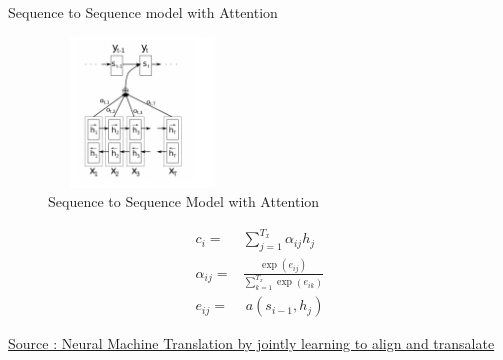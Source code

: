 \documentclass{beamer}
\begin{document}
\begin{frame}{Sequence to Sequence model with Attention}
	\vspace*{-2mm}	

	\begin{figure}
	   \includegraphics[width=5cm, height=4cm]{figs/seq_to_seq_with_attention.png}
	   \caption{Sequence to Sequence Model with Attention}
	\end{figure}

	\vspace*{-10mm}

	\begin{align*}
		c_{i} =& \sum_{j=1}^{T_x}\alpha_{ij}h_{j} \\
		\alpha_{ij} =& \frac{\exp(e_{ij})}{\sum_{k=1}^{T_x} \exp(e_{ik})} \\
		e_{ij} =&\ a(s_{i-1}, h_j)
	\end{align*}



	\href{https://arxiv.org/pdf/1409.0473.pdf}{\tiny Source : Neural Machine Translation by jointly learning to align and transalate}
\end{frame}
\end{document}

